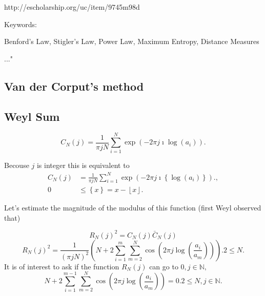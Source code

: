 \documentclass[titlepage,fleqn]{article}%
\providecommand{\U}[1]{\protect\rule{.1in}{.1in}}
\begin{document}
http://escholarship.org/uc/item/9745m98d

Keywords:

Benford's Law, Stigler's Law, Power Law, Maximum Entropy, Distance Measures

..."

\subsection{Van der Corput's method}

\bigskip

\subsection{Weyl Sum}%

\[
C_{N}(j)=\frac{1}{\pi jN}%
{\displaystyle\sum\limits_{i=1}^{N}}
\exp(-2\pi j\imath\log(a_{i})).
\]


Becouse $j$ is integer this is equivalent to%
\begin{align*}
C_{N}(j)  &  =\frac{1}{\pi jN}%
{\displaystyle\sum\limits_{i=1}^{N}}
\exp(-2\pi j\imath\left\{  \log(a_{i})\right\}  ).,\\
0  &  \leq\left\{  x\right\}  =x-\left\lfloor x\right\rfloor .
\end{align*}


Let's estimate the magnitude of the modulus of this function (first Weyl
observed that)

\bigskip%

\[
R_{N}(j)^{2}=C_{N}(j)\bar{C}_{N}(j)
\]%
\[
R_{N}(j)^{2}=\frac{1}{\left(  \pi jN\right)  ^{2}}\left(  N+2%
{\displaystyle\sum\limits_{i=1}^{m}}
{\displaystyle\sum\limits_{m=2}^{N}}
\cos\left(  2\pi j\log\left(  \frac{a_{i}}{a_{m}}\right)  \right)  \right)
.2\leq N.
\]
It is of interest to ask if the function $R_{N}(j)$ can go to $0,j\in%
\mathbb{N}
,$%
\[
N+2%
{\displaystyle\sum\limits_{i=1}^{m-1}}
{\displaystyle\sum\limits_{m=2}^{N}}
\cos\left(  2\pi j\log\left(  \frac{a_{i}}{a_{m}}\right)  \right)  =0.2\leq
N,j\in%
\mathbb{N}
.
\]
\end{document}
